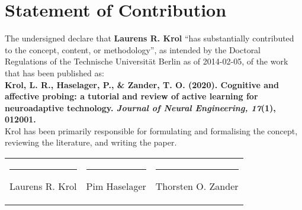 \documentclass[a4paper,12pt]{article}
\title{}
\author{}
\date{}
\begin{document}
\thispagestyle{empty}

\section*{Statement of Contribution}

The undersigned declare that \textbf{Laurens R. Krol} ``has substantially contributed to the concept, content, or methodology'', as intended by the Doctoral Regulations of the Technische Universität Berlin as of 2014-02-05, of the work that has been published as: \\

\textbf{Krol, L. R., Haselager, P., \& Zander, T. O. (2020). Cognitive and affective probing: a tutorial and review of active learning for neuroadaptive technology. \emph{Journal of Neural Engineering, 17}(1), 012001.} \\

Krol has been primarily responsible for formulating and formalising the concept, reviewing the literature, and writing the paper. \\

\begin{tabularx}{\textwidth}{XXX}
\vspace{2cm} \hrule Laurens R. Krol & \vspace{2cm} \hrule Pim Haselager & \vspace{2cm} \hrule Thorsten O. Zander \\
\end{tabularx}
\end{document}
